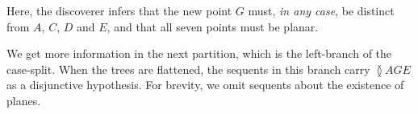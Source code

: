 \linebreak

Here, the discoverer infers that the new point $G$ must, \emph{in any case}, be distinct from $A$, $C$, $D$ and $E$, and that all seven points must be planar. 

We get more information in the next partition, which is the left-branch of the case-split. When the trees are flattened, the sequents in this branch carry $\between{A}{G}{E}$ as a disjunctive hypothesis. For brevity, we omit sequents about the existence of planes.

